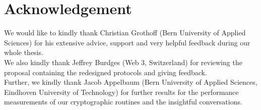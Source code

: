 \section*{Acknowledgement}
We would like to kindly thank Christian Grothoff (Bern University of Applied Sciences) for his extensive advice, support and very helpful feedback during our whole thesis.\\
We also kindly thank Jeffrey Burdges (Web 3, Switzerland) for reviewing the proposal containing the redesigned protocols and giving feedback.\\
Further, we kindly thank Jacob Appelbaum (Bern University of Applied Sciences, Eindhoven University of Technology) for further results for the performance measurements of our cryptographic routines and the insightful conversations.

